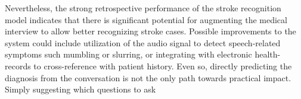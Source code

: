 Nevertheless, the strong retrospective performance of the stroke recognition model indicates that there is significant potential for augmenting the medical interview to allow better recognizing stroke cases. 
Possible improvements to the system could include utilization of the audio signal to detect speech-related symptoms such mumbling or slurring, or integrating with electronic health-records to cross-reference with patient history. 
Even so, directly predicting the diagnosis from the conversation is not the only path towards practical impact. Simply suggesting which questions to ask






















